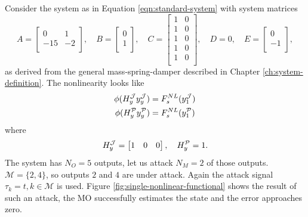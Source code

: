 \begin{example}\label{ex:single-mass-nonlinear-example}
    Consider the system as in Equation \eqref{eqn:standard-system} with system matrices
    \begin{equation*}
        A =
        \begin{bmatrix}
            0 & 1 \\ -15 & -2 \\
        \end{bmatrix}, \quad
        B =
        \begin{bmatrix}
            0 \\ 1 \\
        \end{bmatrix}, \quad
        C = 
        \begin{bmatrix}
            1 & 0 \\ 1 & 0 \\ 1 & 0 \\ 1 & 0 \\ 1 & 0 \\
        \end{bmatrix}, \quad
        D = 0, \quad
        E =
        \begin{bmatrix}
            0 \\ -1 \\
        \end{bmatrix},   
    \end{equation*}
    as derived from the general mass-spring-damper described in Chapter \ref{ch:system-definition}.  The nonlinearity looks like
    \begin{equation*}
        \begin{split}
            \phi(H^{\mathcal{J}}_{y}y^{\mathcal{J}}_{y}) &= F^{NL}_s(y^{\mathcal{J}}_{1}) \\
            \phi(H^{\mathcal{P}}_{y}y^{\mathcal{P}}_{y}) &= F^{NL}_s(y^{\mathcal{P}}_{1}) \\
        \end{split}        
    \end{equation*} 
    where
    \begin{equation*}
        H^{\mathcal{J}}_{y} =
        \begin{bmatrix}
            1 & 0 & 0
        \end{bmatrix}, 
        \quad H^{\mathcal{P}}_{y} = 1.
    \end{equation*}
    The system has $N_O=5$ outputs, let us attack $N_M=2$ of those outputs. $\mathcal{M}=\{2,4\}$, so outputs $2$ and $4$ are under attack. Again the attack signal $\tau_k=t,k \in \mathcal{M}$ is used. Figure \ref{fig:single-nonlinear-functional} shows the result of such an attack, the MO successfully estimates the state and the error approaches zero. 

\end{example}
